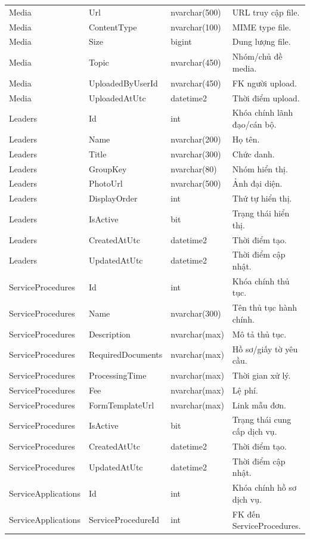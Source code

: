 \documentclass[12pt,a4paper]{article}
\begin{document}
\begin{longtable}{p{3.8cm}p{3.8cm}p{3.0cm}p{6.5cm}}
	Media & Url & nvarchar(500) & URL truy cập file. \\
	Media & ContentType & nvarchar(100) & MIME type file. \\
	Media & Size & bigint & Dung lượng file. \\
	Media & Topic & nvarchar(450) & Nhóm/chủ đề media. \\
	Media & UploadedByUserId & nvarchar(450) & FK người upload. \\
	Media & UploadedAtUtc & datetime2 & Thời điểm upload. \\
	Leaders & Id & int & Khóa chính lãnh đạo/cán bộ. \\
	Leaders & Name & nvarchar(200) & Họ tên. \\
	Leaders & Title & nvarchar(300) & Chức danh. \\
	Leaders & GroupKey & nvarchar(80) & Nhóm hiển thị. \\
	Leaders & PhotoUrl & nvarchar(500) & Ảnh đại diện. \\
	Leaders & DisplayOrder & int & Thứ tự hiển thị. \\
	Leaders & IsActive & bit & Trạng thái hiển thị. \\
	Leaders & CreatedAtUtc & datetime2 & Thời điểm tạo. \\
	Leaders & UpdatedAtUtc & datetime2 & Thời điểm cập nhật. \\
	ServiceProcedures & Id & int & Khóa chính thủ tục. \\
	ServiceProcedures & Name & nvarchar(300) & Tên thủ tục hành chính. \\
	ServiceProcedures & Description & nvarchar(max) & Mô tả thủ tục. \\
	ServiceProcedures & RequiredDocuments & nvarchar(max) & Hồ sơ/giấy tờ yêu cầu. \\
	ServiceProcedures & ProcessingTime & nvarchar(max) & Thời gian xử lý. \\
	ServiceProcedures & Fee & nvarchar(max) & Lệ phí. \\
	ServiceProcedures & FormTemplateUrl & nvarchar(max) & Link mẫu đơn. \\
	ServiceProcedures & IsActive & bit & Trạng thái cung cấp dịch vụ. \\
	ServiceProcedures & CreatedAtUtc & datetime2 & Thời điểm tạo. \\
	ServiceProcedures & UpdatedAtUtc & datetime2 & Thời điểm cập nhật. \\
	ServiceApplications & Id & int & Khóa chính hồ sơ dịch vụ. \\
	ServiceApplications & ServiceProcedureId & int & FK đến ServiceProcedures. \\

\end{longtable}
\end{document}
